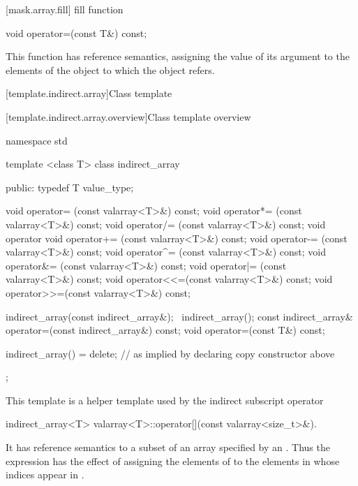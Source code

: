[mask.array.fill]{ fill function}

%
\begin{itemdecl}
void operator=(const T&) const;
\end{itemdecl}

\begin{itemdescr}
\pnum
This function has reference semantics, assigning the value of its
argument to the elements of the
object to which the
object refers.
\end{itemdescr}

[template.indirect.array]{Class template }

[template.indirect.array.overview]{Class template  overview}

%
\begin{codeblock}
namespace std {
  template <class T> class indirect_array {
  public:
    typedef T value_type;

    void operator=  (const valarray<T>&) const;
    void operator*= (const valarray<T>&) const;
    void operator/= (const valarray<T>&) const;
    void operator%
    void operator+= (const valarray<T>&) const;
    void operator-= (const valarray<T>&) const;
    void operator^= (const valarray<T>&) const;
    void operator&= (const valarray<T>&) const;
    void operator|= (const valarray<T>&) const;
    void operator<<=(const valarray<T>&) const;
    void operator>>=(const valarray<T>&) const;

    indirect_array(const indirect_array&);
   ~indirect_array();
    const indirect_array& operator=(const indirect_array&) const;
    void operator=(const T&) const;

    indirect_array() = delete;        // as implied by declaring copy constructor above
  };
}
\end{codeblock}

\pnum
This template is a helper template used by the indirect subscript operator

%
%
\begin{itemdecl}
indirect_array<T> valarray<T>::operator[](const valarray<size_t>&).
\end{itemdecl}

\begin{itemdescr}
\pnum
It has reference semantics to a subset of an array specified by an
.
Thus the expression
has the effect of assigning the elements of
to the elements in
whose indices appear in
.
\end{itemdescr}

